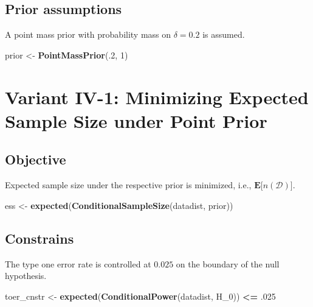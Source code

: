 \documentclass[]{book}
\newenvironment{Shaded}{\begin{snugshade}}{\end{snugshade}}
\newcommand{\DecValTok}[1]{\textcolor[rgb]{0.00,0.00,0.81}{#1}}
\newcommand{\FloatTok}[1]{\textcolor[rgb]{0.00,0.00,0.81}{#1}}
\newcommand{\KeywordTok}[1]{\textcolor[rgb]{0.13,0.29,0.53}{\textbf{#1}}}
\newcommand{\NormalTok}[1]{#1}
\newcommand{\OperatorTok}[1]{\textcolor[rgb]{0.81,0.36,0.00}{\textbf{#1}}}
\newcommand{\StringTok}[1]{\textcolor[rgb]{0.31,0.60,0.02}{#1}}
\begin{document}
\hypertarget{prior-assumptions-3}{%
\subsection{Prior assumptions}\label{prior-assumptions-3}}

A point mass prior with probability mass on \(\delta = 0.2\) is assumed.

\begin{Shaded}
\begin{Highlighting}[]
\NormalTok{prior <-}\StringTok{ }\KeywordTok{PointMassPrior}\NormalTok{(.}\DecValTok{2}\NormalTok{, }\DecValTok{1}\NormalTok{)}
\end{Highlighting}
\end{Shaded}

\hypertarget{variantIV_1}{%
\section{Variant IV-1: Minimizing Expected Sample Size under Point Prior}\label{variantIV_1}}

\hypertarget{objective-7}{%
\subsection{Objective}\label{objective-7}}

Expected sample size under the respective prior is minimized, i.e.,
\(\boldsymbol{E}\big[n(\mathcal{D})\big]\).

\begin{Shaded}
\begin{Highlighting}[]
\NormalTok{ess <-}\StringTok{ }\KeywordTok{expected}\NormalTok{(}\KeywordTok{ConditionalSampleSize}\NormalTok{(datadist, prior))}
\end{Highlighting}
\end{Shaded}

\hypertarget{constrains-7}{%
\subsection{Constrains}\label{constrains-7}}

The type one error rate is controlled at \(0.025\) on the boundary of the
null hypothesis.

\begin{Shaded}
\begin{Highlighting}[]
\NormalTok{toer_cnstr <-}\StringTok{ }\KeywordTok{expected}\NormalTok{(}\KeywordTok{ConditionalPower}\NormalTok{(datadist, H_}\DecValTok{0}\NormalTok{)) }\OperatorTok{<=}\StringTok{ }\FloatTok{.025}
\end{Highlighting}
\end{Shaded}
\end{document}
